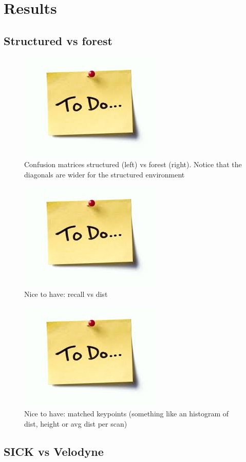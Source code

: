 \section{Results}
\label{sec:chap_slam_results}

\subsection{Structured vs forest}
\label{ssec:chap_slam_struct_vs_forest}

\begin{figure}[htpb]
    \centering
    \includegraphics[width=0.2\linewidth]{img/todo.jpg}
    \caption{Confusion matrices structured (left) vs forest (right). Notice that the diagonals are wider for the structured environment}
    \label{fig:matrices_struct_vs_forest}
\end{figure}

\begin{figure}[htpb]
    \centering
    \includegraphics[width=0.2\linewidth]{img/todo.jpg}
    \caption{Nice to have: recall vs dist}
    \label{fig:recall_dist}
\end{figure}

\begin{figure}[htpb]
    \centering
    \includegraphics[width=0.2\linewidth]{img/todo.jpg}
    \caption{Nice to have: matched keypoints (something like an histogram of dist, height or avg dist per scan)}
    \label{fig:match_avg_dist}
\end{figure}

\subsection{SICK vs Velodyne}
\label{ssec:chap_slam_sick_vs_velodyne}
